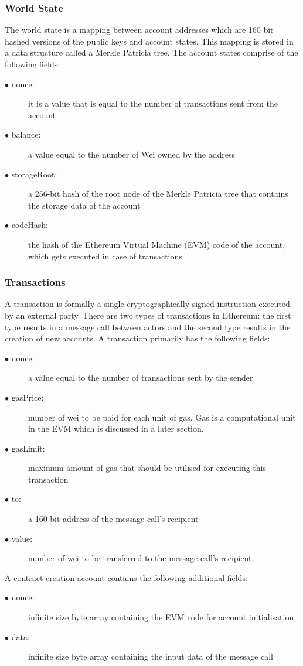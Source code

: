 \documentclass[a4paper,twoside,phd]{BYUPhys}
\begin{document}
\subsubsection{World State}
The world state is a mapping between account addresses which are 160 bit hashed versions of the public keys and account states. This mapping is stored in a data structure called a Merkle Patricia tree. The account states comprise of the following fields;
\begin{description}
\item[$\bullet$ nonce:] it is a value that is equal to the number of transactions sent from the account
\item[$\bullet$ balance:] a value equal to the number of Wei owned by the address
\item[$\bullet$ storageRoot:] a 256-bit hash of the root node of the Merkle Patricia tree that contains the storage data of the account
\item[$\bullet$ codeHash:] the hash of the Ethereum Virtual Machine (EVM) code of the account, which gets executed in case of transactions
\end{description}
\subsubsection{Transactions}
A transaction is formally a single cryptographically signed instruction executed by an external party\cite{}. There are two types of transactions in Ethereum: the first type results in a message call between actors and the second type results in the creation of new accounts\cite{}. A transaction primarily has the following fields\cite{}:
\begin{description}
\item[$\bullet$ nonce:] a value equal to the number of transactions sent by the sender
\item[$\bullet$ gasPrice:] number of wei to be paid for each unit of gas. Gas is a computational unit in the EVM which is discussed in a later section.
\item[$\bullet$ gasLimit:] maximum amount of gas that should be utilised for executing this transaction
\item[$\bullet$ to:] a 160-bit address of the message call's recipient 
\item[$\bullet$ value:] number of wei to be transferred to the message call's recipient
\end{description}
A contract creation account contains the following additional fields\cite{}:
\begin{description}
\item[$\bullet$ nonce:] infinite size byte array containing the EVM code for account initialisation
\item[$\bullet$ data:] infinite size byte array containing the input data of the message call
\end{description}
\begin{description}
\item[]
\end{description}
\end{document}
